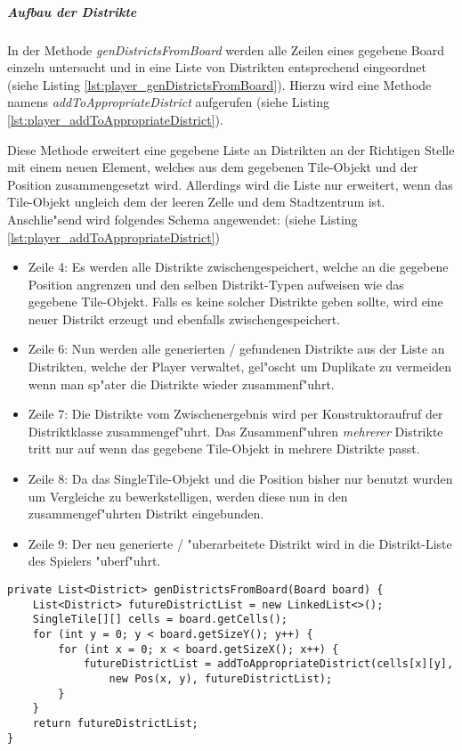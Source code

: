 \subparagraph{Aufbau der Distrikte}
\label{spar:aufbauDerDistrikte}
In der Methode \emph{genDistrictsFromBoard} werden alle Zeilen eines gegebene Board einzeln untersucht und in eine Liste von Distrikten entsprechend eingeordnet (siehe Listing \ref{lst:player_genDistrictsFromBoard}). Hierzu wird eine Methode namens \emph{addToAppropriateDistrict} aufgerufen (siehe Listing \ref{lst:player_addToAppropriateDistrict}). 

Diese Methode erweitert eine gegebene Liste an Distrikten an der Richtigen Stelle mit einem neuen Element, welches aus dem gegebenen Tile-Objekt und der Position zusammengesetzt wird. Allerdings wird die Liste nur erweitert, wenn das Tile-Objekt ungleich dem der leeren Zelle und dem Stadtzentrum ist. Anschlie"send wird folgendes Schema angewendet:  (siehe Listing \ref{lst:player_addToAppropriateDistrict})
\begin{itemize}
	\item Zeile 4: Es werden alle Distrikte zwischengespeichert, welche an die gegebene Position angrenzen und den selben Distrikt-Typen aufweisen wie das gegebene Tile-Objekt. Falls es keine solcher Distrikte geben sollte, wird eine neuer Distrikt erzeugt und ebenfalls zwischengespeichert. 
	\item Zeile 6: Nun werden alle generierten / gefundenen Distrikte aus der Liste an Distrikten, welche der Player verwaltet, gel"oscht um Duplikate zu vermeiden wenn man sp"ater die Distrikte wieder zusammenf"uhrt.
	\item Zeile 7: Die Distrikte vom Zwischenergebnis wird per Konstruktoraufruf der Distriktklasse zusammengef"uhrt. Das Zusammenf"uhren \emph{mehrerer} Distrikte tritt nur auf wenn das gegebene Tile-Objekt in mehrere Distrikte passt. 
	\item Zeile 8: Da das SingleTile-Objekt und die Position bisher nur benutzt wurden um Vergleiche zu bewerkstelligen, werden diese nun in den zusammengef"uhrten Distrikt eingebunden. 
	\item Zeile 9: Der neu generierte / "uberarbeitete Distrikt wird in die Distrikt-Liste des Spielers "uberf"uhrt. 
\end{itemize}

\begin{lstlisting}[style=CodeHighlighting,float,caption=Player - genDistrictsFromBoard,label=lst:player_genDistrictsFromBoard]
private List<District> genDistrictsFromBoard(Board board) {
    List<District> futureDistrictList = new LinkedList<>();
    SingleTile[][] cells = board.getCells();
    for (int y = 0; y < board.getSizeY(); y++) {
        for (int x = 0; x < board.getSizeX(); x++) {
            futureDistrictList = addToAppropriateDistrict(cells[x][y], 
            	new Pos(x, y), futureDistrictList);
        }
    }
    return futureDistrictList;
}
\end{lstlisting}

